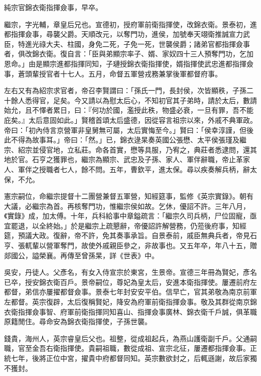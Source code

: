 \begin{pinyinscope}
純宗官錦衣衛指揮僉事，早卒。

繼宗，字光輔，章皇后兄也。宣德初，授府軍前衛指揮使，改錦衣衛。景泰初，進都指揮僉事，尋襲父爵。天順改元，以奪門功，進侯，加號奉天翊衛推誠宣力武臣，特進光祿大夫、柱國，身免二死，子免一死，世襲侯爵；諸弟官都指揮僉事者，俱改錦衣衛。復自言：「臣與弟顯宗率子、婿、家奴四十三人預奪門功，乞加恩命。」由是顯宗進都指揮同知，子璉授錦衣衛指揮使，婿指揮使武忠進都指揮僉事，蒼頭輩授官者十七人。五月，命督五軍營戎務兼掌後軍都督府事。

左右又有為紹宗求官者，帝召李賢謂曰：「孫氏一門，長封侯，次皆顯秩，子孫二十餘人悉得官，足矣。今又請以為慰太后心，不知初官其子弟時，請於太后，數請始允，且不懌者累日，曰：『何功於國，濫授此秩，物盛必衰，一旦有罪，吾不能庇矣。』太后意固如此。」賢稽首頌太后盛德，因從容言祖宗以來，外戚不典軍政。帝曰：「初內侍言京營軍非皇舅無可屬，太后實悔至今。」賢曰：「侯幸淳謹，但後此不得為故事耳。」帝曰：「然。」已，錦衣逯杲奏英國公張懋、太平侯張瑾及繼宗、紹宗並侵官地，立私莊。命各首實，懋等具服，乃宥之，典莊者悉逮問，還其地於官。石亨之獲罪也，繼宗為顯宗、武忠及子孫、家人、軍伴辭職，帝止革家人、軍伴之授職者七人，餘不問。五年，曹欽平，進太保。尋以疾奏解兵柄，辭太保，不允。

憲宗嗣位，命繼宗提督十二團營兼督五軍營，知經筵事，監修《英宗實錄》。朝有大議，必繼宗為首。再核奪門功，惟繼宗侯如故。乞休，優詔不許。三年八月，《實錄》成，加太傅。十年，兵科給事中章鎰疏言：「繼宗久司兵柄，尸位固寵，亟宜罷退，以全終始。」於是繼宗上疏懇辭，帝優詔許解營務，仍蒞後府事，知經筵，預議大政。復辭，帝不許，免其奏事承旨。自景泰前，戚臣無典兵者，帝見石亨、張軏輩以營軍奪門，故使外戚親臣參之，非故事也。又五年卒，年八十五，贈郯國公，謚榮襄。再傳至曾孫杲，詳《世表》中。

吳安，丹徒人。父彥名，有女入侍宣宗於東宮，生景帝。宣德三年冊為賢妃，彥名已卒，授安錦衣衛百戶。景帝嗣位，尊妃為皇太后，安進本衛指揮使。屢遷前府左都督，弟信亦屢擢都督僉事。景泰七年封安安平伯。信早亡，官其弟敬為南京前軍左都督。英宗復辟，太后復稱賢妃，降安為府軍前衛指揮僉事。敬及其群從南京錦衣衛指揮僉事智、府軍前衛指揮同知喜山、指揮僉事廣林、錦衣衛千戶誠，俱革職原籍閒住。尋命安為錦衣衛指揮使，子孫世襲。

錢貴，海州人，英宗睿皇后父也。祖整，從成祖起兵，為燕山護衛副千戶。父通嗣職，官至金吾右衛指揮使。貴嗣祖職，數從成祖、宣宗北征，屢遷都指揮僉事。正統七年，後將正位中宮，擢貴中府都督同知。英宗數欲封之，后輒遜謝，故后家獨不獲封。


\end{pinyinscope}
